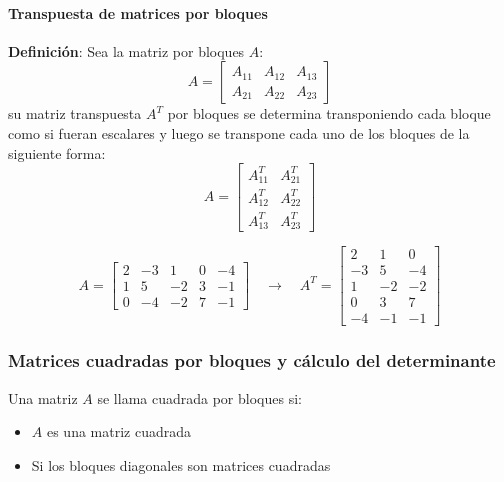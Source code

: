 \paragraph{Transpuesta de matrices por bloques}

\textbf{Definición}: Sea la matriz por bloques \(A\):
\[
  A= \begin{bmatrix}
    A_{11} & A_{12} & A_{13} \\
    A_{21} & A_{22} & A_{23}
  \end{bmatrix}
\]
su matriz transpuesta \(A^T\) por bloques se determina transponiendo cada bloque como si fueran escalares y luego se transpone cada uno de los bloques de la siguiente forma:
\[
A = \begin{bmatrix}
  A_{11}^T & A_{21}^T \\
  A_{12}^T & A_{22}^T \\
  A_{13}^T & A_{23}^T
\end{bmatrix}
\]


\[
  A = \left[\begin{array}{ccc|cc}
    2 & -3 & 1 & 0 & -4 \\
    1 & 5 & -2 & 3 & -1 \\
    \hline
    0 & -4 & -2 & 7 & -1
  \end{array}\right] \quad \rightarrow \quad A^T = \left[\begin{array}{cc|c}
    2 & 1 & 0 \\
    -3 & 5 & -4 \\
    1 & -2 & -2 \\
    \hline
    0 & 3 & 7 \\
    -4 & -1 & -1
  \end{array}\right] 
\]

\subsubsection{Matrices cuadradas por bloques y cálculo del determinante}

Una matriz \(A\) se llama cuadrada por bloques si:
\begin{itemize}
  \item \(A\) es una matriz cuadrada
  \item Si los bloques diagonales son matrices cuadradas
\end{itemize}


